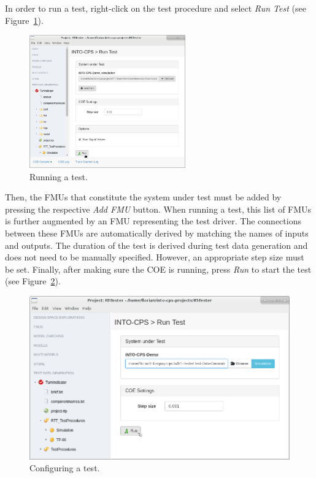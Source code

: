 In order to run a test, right-click on the test procedure and select
\emph{Run Test} (see Figure~\ref{figure:INTO-CPS-App:Run-Test}).
%
%
%
\begin{figure}[ht]
    \centerline{\includegraphics[width=0.6\textwidth]{figures/VSI-TDG_Run-Test}}
    \caption{Running a test.}
    \label{figure:INTO-CPS-App:Run-Test}
\end{figure}
%
%
%
Then, the FMUs that constitute the system under test must be added by pressing the
respective \emph{Add FMU} button.
When running a test, this list of FMUs is further augmented by an FMU representing
the test driver.
The connections between these FMUs are automatically derived by matching the
names of inputs and outputs.
The duration of the test is derived during test data generation
and does not need to be manually specified.
However, an appropriate step size must be set.
Finally, after making sure the COE is running, press \emph{Run} to start the test
(see Figure~\ref{figure:INTO-CPS-App:Run-Test-Dialog}).
%
%
%
\begin{figure}[ht]
    \centerline{\includegraphics[width=\textwidth]{figures/VSI-TDG_Run-Test-Dialog}}
    \caption{Configuring a test.}
    \label{figure:INTO-CPS-App:Run-Test-Dialog}
\end{figure}
%
%
%

